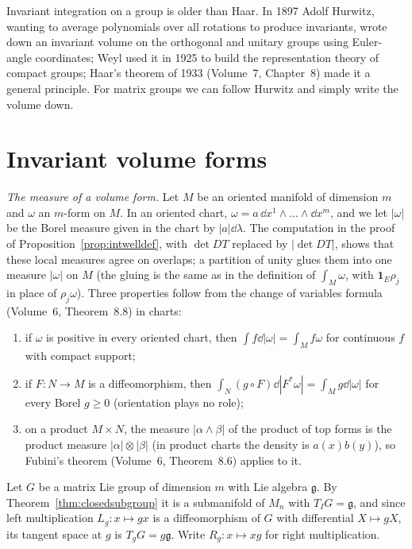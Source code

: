 Invariant integration on a group is older than Haar. In 1897 Adolf Hurwitz, wanting to average polynomials over all rotations to produce invariants,
wrote down an invariant volume on the orthogonal and unitary groups using Euler-angle coordinates; Weyl used it in 1925 to build the representation
theory of compact groups; Haar's theorem of 1933 (Volume~7, Chapter~8) made it a general principle. For matrix groups we can follow Hurwitz and simply
write the volume down.

\section{Invariant volume forms}

\emph{The measure of a volume form.} Let $M$ be an oriented manifold of dimension $m$ and $\omega$ an $m$-form on $M$. In an oriented chart, $\omega=a\,\dd x^1\wedge\dots\wedge\dd x^m$,
and we let $|\omega|$ be the Borel measure given in the chart by $|a|\dd\lambda$. The computation in the proof of Proposition~\ref{prop:intwelldef}, with $\det DT$ replaced
by $|\det DT|$, shows that these local measures agree on overlaps; a partition of unity glues them into one measure $|\omega|$ on $M$ (the gluing is the
same as in the definition of $\int_M\omega$, with $\mathbf 1_E\rho_j$ in place of $\rho_j\omega$). Three properties follow from the change of variables formula
(Volume~6, Theorem~8.8) in charts:
\begin{enumerate}
\item[(i)] if $\omega$ is positive in every oriented chart, then $\int f\dd|\omega|=\int_Mf\omega$ for continuous $f$ with compact support;
\item[(ii)] if $F\colon N\to M$ is a diffeomorphism, then $\int_N(g\circ F)\dd|F^*\omega|=\int_Mg\dd|\omega|$ for every Borel $g\ge0$ (orientation plays no role);
\item[(iii)] on a product $M\times N$, the measure $|\alpha\wedge\beta|$ of the product of top forms is the product measure $|\alpha|\otimes|\beta|$ (in product charts the density is $a(x)b(y)$),
so Fubini's theorem (Volume~6, Theorem~8.6) applies to it.
\end{enumerate}

Let $G$ be a matrix Lie group of dimension $m$ with Lie algebra $\mathfrak g$. By Theorem~\ref{thm:closedsubgroup} it is a submanifold of $M_n$ with $T_IG=\mathfrak g$, and since left
multiplication $L_g\colon x\mapsto gx$ is a diffeomorphism of $G$ with differential $X\mapsto gX$, its tangent space at $g$ is $T_gG=g\mathfrak g$. Write $R_g\colon x\mapsto xg$ for right multiplication.

